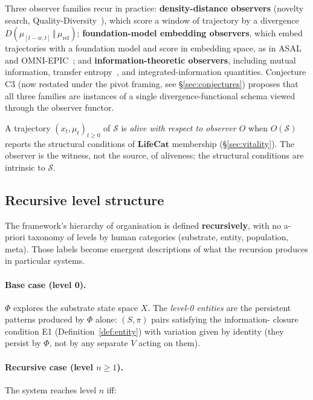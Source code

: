 \documentclass[journal]{IEEEtran}
\theoremstyle{plain}
\theoremstyle{definition}
\theoremstyle{plain}
\begin{document}
Three observer families recur in practice:
\textbf{density-distance observers} (novelty search,
Quality-Diversity~\cite{lehman2011novelty,faldor2024leniaqd}), which
score a window of trajectory by a divergence $D(\mu_{[t-w,t]} \,\Vert\,
\mu_{\mathrm{ref}})$;
\textbf{foundation-model embedding observers}, which embed trajectories
with a foundation model and score in embedding space, as in
ASAL~\cite{kumar2024asal} and OMNI-EPIC~\cite{faldor2024omniepic};
and \textbf{information-theoretic observers}, including mutual
information, transfer entropy~\cite{schreiber2000measuring}, and
integrated-information quantities. Conjecture C3 (now restated under the
pivot framing, see \S\ref{sec:conjectures}) proposes that all three
families are instances of a single divergence-functional schema viewed
through the observer functor.

A trajectory $(x_t,\mu_t)_{t \geq 0}$ of $\mathcal{S}$ is \emph{alive
with respect to observer $O$} when $O(\mathcal{S})$ reports the
structural conditions of $\mathbf{LifeCat}$ membership
(\S\ref{sec:vitality}). The observer is the witness, not the source, of
aliveness; the structural conditions are intrinsic to $\mathcal{S}$.

\subsection{Recursive level structure}\label{sec:recursive-levels}

The framework's hierarchy of organisation is defined \textbf{recursively},
with no a-priori taxonomy of levels by human categories (substrate,
entity, population, meta). Those labels become emergent descriptions of
what the recursion produces in particular systems.

\paragraph{Base case (level 0).} $\Phi$ explores the substrate state
space $X$. The \emph{level-0 entities} are the persistent patterns
produced by $\Phi$ alone: $(S, \pi)$ pairs satisfying the information-
closure condition E1 (Definition~\ref{def:entity}) with variation given
by identity (they persist by $\Phi$, not by any separate $V$ acting on
them).

\paragraph{Recursive case (level $n \geq 1$).} The system reaches level
$n$ iff:
\end{document}
